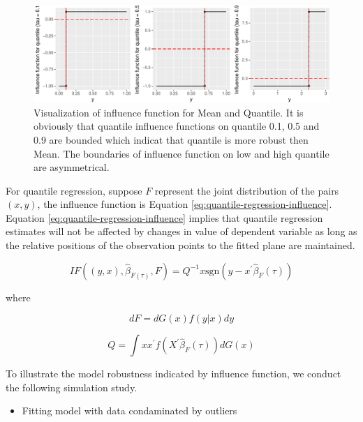 \documentclass[11pt,a4paper,]{article}
\providecommand{\tightlist}{%
  \setlength{\itemsep}{0pt}\setlength{\parskip}{0pt}}
\theoremstyle{definition}
\theoremstyle{definition}
\theoremstyle{remark}
\begin{document}
\begin{figure}

{\centering \includegraphics{main_files/figure-latex/vis-if-1} 

}

\caption{Visualization of influence function for Mean and Quantile. It is obviously that quantile influence functions on quantile 0.1, 0.5 and 0.9 are bounded which indicat that quantile is more robust then Mean. The boundaries of influence function on low and high quantile are asymmetrical.}\label{fig:vis-if}
\end{figure}

For quantile regression, suppose \(F\) represent the joint distribution
of the pairs \((x,y)\), the influence function is Equation
\eqref{eq:quantile-regression-influence}. Equation
\eqref{eq:quantile-regression-influence} implies that quantile regression
estimates will not be affected by changes in value of dependent variable
as long as the relative positions of the observation points to the
fitted plane are maintained.

\begin{equation}
IF((y,x),\hat{\beta}_{F(\tau)},F)=Q^{-1}x\text{sgn}(y-x^{'}\hat{\beta}_{F}(\tau))
\label{eq:quantile-regression-influence}
\end{equation}

where

\begin{equation}
dF=dG(x)f(y|x)dy
\label{eq: dg}
\end{equation}

\begin{equation}
Q=\int xx^{'}f(X^{'}\hat{\beta}_{F}(\tau))dG(x)
\label{eq:q_influence}
\end{equation}

To illustrate the model robustness indicated by influence function, we
conduct the following simulation study.

\begin{itemize}
\tightlist
\item
  Fitting model with data condaminated by outliers
\end{itemize}
\end{document}

